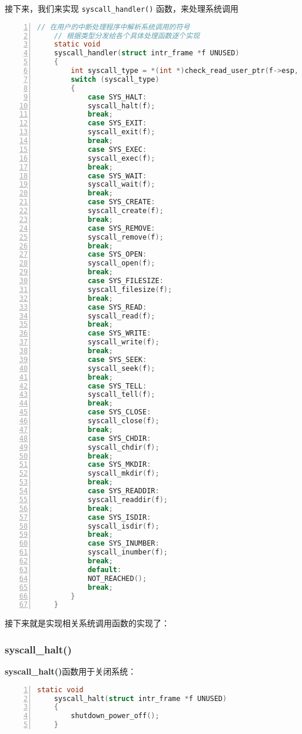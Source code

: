 \documentclass{article}
\begin{document}
	接下来，我们来实现 \texttt{syscall\_handler()} 函数，来处理系统调用
	
	\begin{lstlisting}[xleftmargin = 4em,xrightmargin = 4em, aboveskip = 1em, numbers = left, language = C,title=src/userprog/syscall.c - \texttt{page\_fault()}]
    // 在用户的中断处理程序中解析系统调用的符号
    // 根据类型分发给各个具体处理函数逐个实现
    static void
    syscall_handler(struct intr_frame *f UNUSED)
    {
    	int syscall_type = *(int *)check_read_user_ptr(f->esp, sizeof(int));
    	switch (syscall_type)
    	{
    		case SYS_HALT:
    		syscall_halt(f);
    		break;
    		case SYS_EXIT:
    		syscall_exit(f);
    		break;
    		case SYS_EXEC:
    		syscall_exec(f);
    		break;
    		case SYS_WAIT:
    		syscall_wait(f);
    		break;
    		case SYS_CREATE:
    		syscall_create(f);
    		break;
    		case SYS_REMOVE:
    		syscall_remove(f);
    		break;
    		case SYS_OPEN:
    		syscall_open(f);
    		break;
    		case SYS_FILESIZE:
    		syscall_filesize(f);
    		break;
    		case SYS_READ:
    		syscall_read(f);
    		break;
    		case SYS_WRITE:
    		syscall_write(f);
    		break;
    		case SYS_SEEK:
    		syscall_seek(f);
    		break;
    		case SYS_TELL:
    		syscall_tell(f);
    		break;
    		case SYS_CLOSE:
    		syscall_close(f);
    		break;
    		case SYS_CHDIR:
    		syscall_chdir(f);
    		break;
    		case SYS_MKDIR:
    		syscall_mkdir(f);
    		break;
    		case SYS_READDIR:
    		syscall_readdir(f);
    		break;
    		case SYS_ISDIR:
    		syscall_isdir(f);
    		break;
    		case SYS_INUMBER:
    		syscall_inumber(f);
    		break;
    		default:
    		NOT_REACHED();
    		break;
    	}
    }
	\end{lstlisting}
	
	接下来就是实现相关系统调用函数的实现了：
	
	\subsubsection{syscall\_halt()}
	
	\textbf{syscall\_halt()}函数用于关闭系统：
	
	\begin{lstlisting}[xleftmargin = 4em,xrightmargin = 4em, aboveskip = 1em, numbers = left, language = C,title=src/userprog/syscall.c - \texttt{syscall\_halt()}]
    static void
    syscall_halt(struct intr_frame *f UNUSED)
    {
    	shutdown_power_off();
    }
	\end{lstlisting}
	
\end{document}
